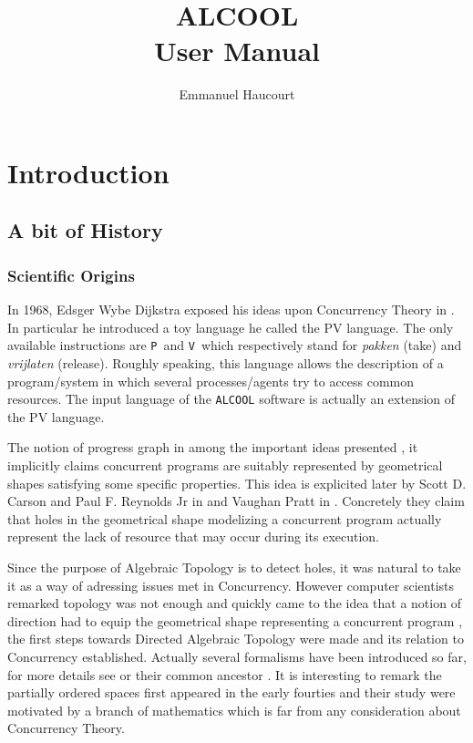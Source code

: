 \documentclass[article,11pt]{amsbook}
\title{ALCOOL\\User Manual}
\author{\small\sf Emmanuel Haucourt}
\def\alcool{\texttt{ALCOOL} }
\def\P{\texttt{P}}
\def\V{\texttt{V}}
\def\pv{{\sf PV} }
\begin{document}
\maketitle
\tableofcontents
\chapter{Introduction}
\section{A bit of History}
\subsection{Scientific Origins}
In 1968, Edsger Wybe Dijkstra exposed his ideas upon Concurrency Theory
in \cite{DEW68}. In particular he introduced a toy language he called
the \pv language. The only available instructions are \P\ and \V\ which
respectively stand for {\em pakken} (take) and {\em vrijlaten}
(release). Roughly speaking, this language allows the description of a
program/system in which several processes/agents try to access common
resources. The input language of the \alcool software is actually an
extension of the \pv language.

The notion of progress graph in among the important ideas presented
\cite{DEW68}, it implicitly claims concurrent programs are suitably
represented by geometrical shapes satisfying some specific
properties. This idea is explicited later by Scott D. Carson and Paul
F. Reynolds Jr in \cite{CR87} and Vaughan Pratt in
\cite{PV00}. Concretely they claim that holes in the geometrical shape
modelizing a concurrent program actually represent the lack of resource
that may occur during its execution. 

Since the purpose of Algebraic Topology is to detect holes, it was
 natural to take it as a way of adressing issues met in Concurrency.
 However computer scientists remarked topology was not enough and
 quickly came to the idea that a notion of direction had to equip the
 geometrical shape representing a concurrent program \cite{FGGHPRR00},
 the first steps towards Directed Algebraic Topology were made and its
 relation to Concurrency established. Actually several formalisms have
 been introduced so far, for more details see
 \cite{FGR06,GM03,KSPhD,KS09} or their common ancestor \cite{NL65}. It
 is interesting to remark the partially ordered spaces \cite{NL65} first
 appeared in the early fourties \cite{ES41} and their study were
 motivated by a branch of mathematics which is far from any
 consideration about Concurrency Theory.
\end{document}
